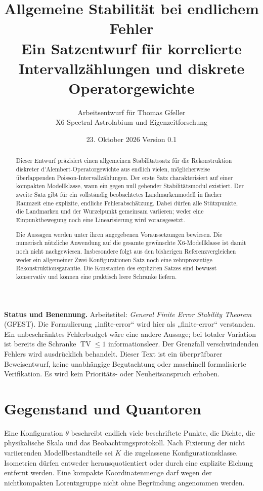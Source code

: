 \documentclass[11pt,a4paper]{article}
\title{\textbf{Allgemeine Stabilität bei endlichem Fehler}\\[5pt]\large Ein Satzentwurf für korrelierte Intervallzählungen und diskrete Operatorgewichte}
\author{Arbeitsentwurf für Thomas Gfeller\\\small X6 Spectral Astrolabium und Eigenzeitforschung}
\date{23. Oktober 2026 \quad Version 0.1}
\theoremstyle{definition}\newtheorem{definition}{Definition}
\theoremstyle{remark}\newtheorem*{remark}{Bemerkung}
\newcommand{\TV}{\operatorname{TV}}
\newcommand{\GFEST}{General Finite Error Stability Theorem}
\begin{document}
\maketitle
\thispagestyle{fancy}
\begin{abstract}
Dieser Entwurf präzisiert einen allgemeinen Stabilitätssatz für die Rekonstruktion diskreter d'Alembert-Operatorgewichte aus endlich vielen, möglicherweise überlappenden Poisson-Intervallzählungen. Der erste Satz charakterisiert auf einer kompakten Modellklasse, wann ein gegen null gehender Stabilitätsmodul existiert. Der zweite Satz gibt für ein vollständig beobachtetes Landmarkenmodell in flacher Raumzeit eine explizite, endliche Fehlerabschätzung. Dabei dürfen alle Stützpunkte, die Landmarken und der Wurzelpunkt gemeinsam variieren; weder eine Einpunktbewegung noch eine Linearisierung wird vorausgesetzt.

Die Aussagen werden unter ihren angegebenen Voraussetzungen bewiesen. Die numerisch nützliche Anwendung auf die gesamte gewünschte X6-Modellklasse ist damit noch nicht nachgewiesen. Insbesondere folgt aus den bisherigen Referenzvergleichen weder ein allgemeiner Zwei-Konfigurationen-Satz noch eine zehnprozentige Rekonstruktionsgarantie. Die Konstanten des expliziten Satzes sind bewusst konservativ und können eine praktisch leere Schranke liefern.
\end{abstract}

\textbf{Status und Benennung.} Arbeitstitel: \emph{\GFEST} (GFEST). Die Formulierung „infite-error“ wird hier als „finite-error“ verstanden. Ein unbeschränktes Fehlerbudget wäre eine andere Aussage; bei totaler Variation ist bereits die Schranke $\TV\leq1$ informationsleer. Der Grenzfall verschwindenden Fehlers wird ausdrücklich behandelt. Dieser Text ist ein überprüfbarer Beweisentwurf, keine unabhängige Begutachtung oder maschinell formalisierte Verifikation. Es wird kein Prioritäts- oder Neuheitsanspruch erhoben.

\section{Gegenstand und Quantoren}

Eine Konfiguration $\theta$ beschreibt endlich viele beschriftete Punkte, die Dichte, die physikalische Skala und das Beobachtungsprotokoll. Nach Fixierung der nicht variierenden Modellbestandteile sei $K$ die zugelassene Konfigurationsklasse. Isometrien dürfen entweder herausquotientiert oder durch eine explizite Eichung entfernt werden. Eine kompakte Koordinatenmenge darf wegen der nichtkompakten Lorentzgruppe nicht ohne Begründung angenommen werden.
\end{document}
